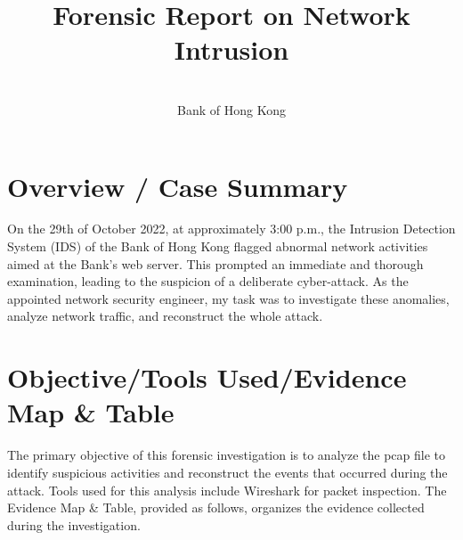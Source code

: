 \documentclass{article}
\title{\fontsize{16pt}{19pt}\selectfont\textbf{Forensic Report on Network Intrusion}}
\author{\fontsize{12pt}{14pt}\selectfont [Your Name] \\ Bank of Hong Kong}
\date{\fontsize{12pt}{14pt}\selectfont [Date of the Report]}
\begin{document}
    \maketitle

    \section{\fontsize{14pt}{17pt}\selectfont Overview / Case Summary}\label{sec:selectfont-overview-/-case-summary}
    On the 29th of October 2022, at approximately 3:00 p.m.,
    the Intrusion Detection System (IDS) of the Bank of Hong Kong flagged abnormal network activities aimed at the Bank's web server.
    This prompted an immediate and thorough examination,
    leading to the suspicion of a deliberate cyber-attack.
    As the appointed network security engineer, my task was to investigate these anomalies,
    analyze network traffic, and reconstruct the whole attack.

    \section{\fontsize{14pt}{17pt}\selectfont Objective/Tools Used/Evidence Map \& Table}\label{sec:selectfont-objective/tools-used/evidence-map-&-table}
    The primary objective of this forensic investigation is to analyze the pcap file to identify suspicious activities
    and reconstruct the events that occurred during the attack.
    Tools used for this analysis include Wireshark for packet inspection.
    The Evidence Map & Table, provided as follows, organizes the evidence collected during the investigation.
\end{document}
